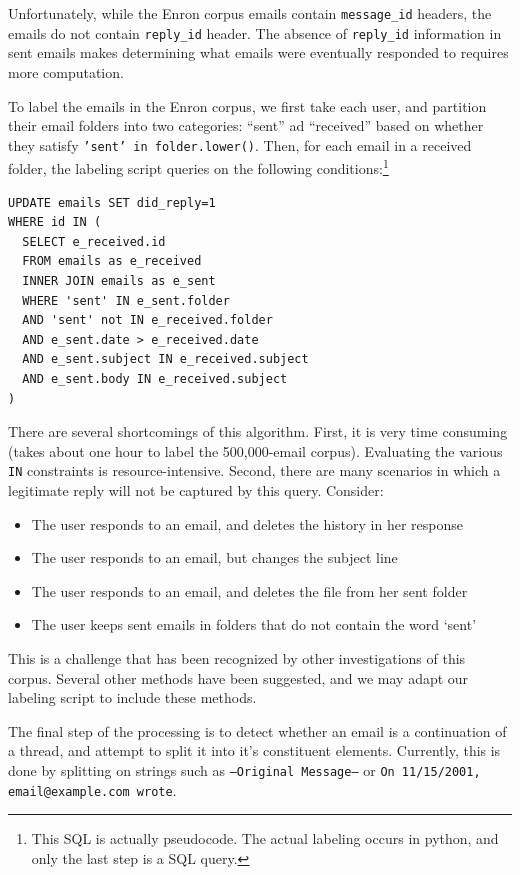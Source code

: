 \documentclass[10pt]{article}
\begin{document}
Unfortunately, while the Enron corpus emails contain \texttt{message\_id} headers, the emails do not contain \texttt{reply\_id} header. The absence of \texttt{reply\_id} information in sent emails makes determining what emails were eventually responded to requires more computation.

To label the emails in the Enron corpus, we first take each user, and partition their email folders into two categories: ``sent'' ad ``received'' based on whether they satisfy \texttt{'sent' in folder.lower()}. Then, for each email in a received folder, the labeling script queries on the following conditions:\footnote{This SQL is actually pseudocode. The actual labeling occurs in python, and only the last step is a SQL query.}
\begin{verbatim}
UPDATE emails SET did_reply=1
WHERE id IN (
  SELECT e_received.id
  FROM emails as e_received
  INNER JOIN emails as e_sent
  WHERE 'sent' IN e_sent.folder 
  AND 'sent' not IN e_received.folder
  AND e_sent.date > e_received.date
  AND e_sent.subject IN e_received.subject
  AND e_sent.body IN e_received.subject
)
\end{verbatim}

There are several shortcomings of this algorithm. First, it is very time consuming (takes about one hour to label the 500,000-email corpus). Evaluating the various \texttt{IN} constraints is resource-intensive. Second, there are many scenarios in which a legitimate reply will not be captured by this query. Consider:
\begin{itemize}[noitemsep]
    \item The user responds to an email, and deletes the history in her response
    \item The user responds to an email, but changes the subject line
    \item The user responds to an email, and deletes the file from her sent folder
    \item The user keeps sent emails in folders that do not contain the word `sent'
\end{itemize}

This is a challenge that has been recognized by other investigations of this corpus. Several other methods have been suggested, and we may adapt our labeling script to include these methods\cite{cruzalbrecht:2017,knight:2014}.

The final step of the processing is to detect whether an email is a continuation of a thread, and attempt to split it into it's constituent elements. Currently, this is done by splitting on strings such as \texttt{---Original Message---} or \texttt{On 11/15/2001, email@example.com wrote}.
\end{document}
